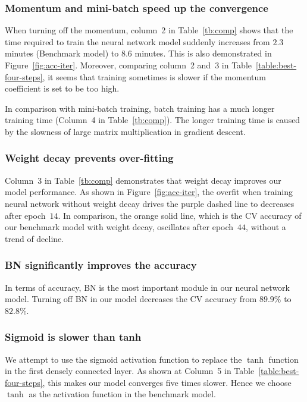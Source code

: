 \subsubsection{Momentum and mini-batch speed up the convergence}
When turning off the momentum, column~2 in Table~\ref{tb:comp} shows that the time required to train the neural network model suddenly increases from $2.3$ minutes (Benchmark model) to $8.6$ minutes. This is also demonstrated in Figure~\ref{fig:acc-iter}. Moreover, comparing column~2 and~3 in Table~\ref{table:best-four-steps}, it seems that  training sometimes is slower if the momentum coefficient is set to be too high.

In comparison with mini-batch training, batch training has a much longer training time  (Column~4 in Table~\ref{tb:comp}). The longer training time is caused by the slowness of large matrix multiplication in gradient descent.

\subsubsection{Weight decay prevents over-fitting}
Column~3 in Table~\ref{tb:comp} demonstrates that weight decay improves our model performance. As shown in Figure~\ref{fig:acc-iter}, the overfit when training neural network without weight decay drives the purple dashed line to decreases after epoch~$14$. In comparison, the orange solid line, which is the CV accuracy of our benchmark model with weight decay, oscillates after epoch~$44$, without a trend of decline.


\subsubsection{BN significantly improves the accuracy}
In terms of accuracy, BN is the most important module in our neural network model. Turning off BN in our model decreases the CV accuracy from $89.9\%$ to $82.8\%$.


\subsubsection{Sigmoid is slower than tanh}
We attempt to use the sigmoid activation function to replace the $\tanh$ function in the first densely connected layer. As shown at Column~5 in Table~\ref{table:best-four-steps}, this makes our model converges five times slower. Hence we choose $\tanh$ as the activation function in the benchmark model.





